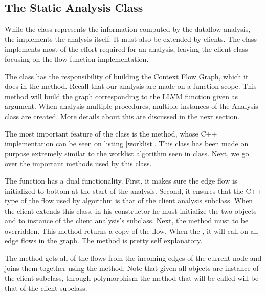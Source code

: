 \subsection{The Static Analysis Class}

While the  class represents the information computed by the dataflow analysis, the  implements the analysis itself. It must also be extended by clients. The  class implements most of the effort required for an analysis, leaving the client class focusing on the flow function implementation.

The  class has the responsibility of building the Context Flow Graph, which it does in the  method. Recall that our analysis are made on a function scope. This method will build the graph corresponding to the LLVM function given as argument. When analysis multiple procedures, multiple instances of the Analysis class are created. More details about this are discussed in the next section.

The most important feature of the  class is the  method, whose C++ implementation can be seen on listing \ref{worklist}. This class has been made on purpose extremely similar to the worklist algorithm seen in class. Next, we go over the important methods used by this class.

The  function has a dual functionality. First, it makes sure the edge flow is initialized to bottom at the start of the analysis. Second, it ensures that the C++ type of the flow used by algorithm is that of the client analysis subclass. When the client extends this class, in his constructor he must initialize the two  objects  and  to instance of the client analysis's  subclass. Next, the  method must to be overridden. This method returns a copy of the  flow. When the  , it will call  on all edge flows in the graph. The method  is pretty self explanatory.

The  method gets all of the flows from the incoming edges of the current node and joins them together using the  method. Note that given all  objects are instance of the client subclass, through polymorphism the  method that will be called will be that of the client subclass.

